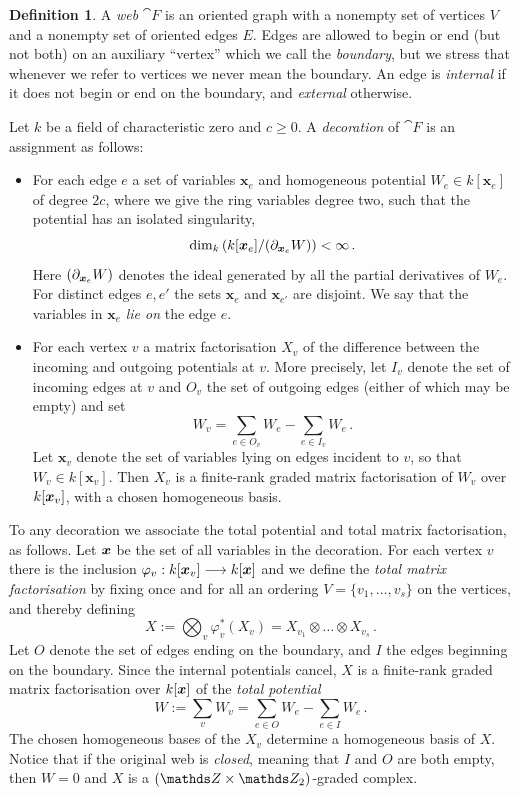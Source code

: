 \documentclass{compositio}
\theoremstyle{definition}
\newtheorem{definition}[theorem]{Definition}
\numberwithin{equation}{section}
\begin{document}
\begin{definition}\label{defwebs}
A \emph{web} $\cat{F}$ is an oriented graph with a nonempty set of vertices $V$ and a nonempty set of oriented edges $E$. Edges are allowed to begin or end (but not both) on an auxiliary ``vertex'' which we call the \emph{boundary}, but we stress that whenever we refer to vertices we never mean the boundary. An edge is \emph{internal} if it does not begin or end on the boundary, and \emph{external} otherwise. 

Let $k$ be a field of characteristic zero and $c \ge 0$. A \emph{decoration} of $\cat{F}$ is an assignment as follows:
\begin{itemize}
\item For each edge $e$ a set of variables $\boldsymbol{x}_e$ and homogeneous potential $W_e \in k[\boldsymbol{x}_e]$ of degree $2c$, where we give the ring variables degree two, such that the potential has an isolated singularity, 
\[
\dim_k\left( k[\boldsymbol{x}_e]/(\partial_{\boldsymbol{x}_e} W) \right) < \infty \, .
\]
Here $(\partial_{\boldsymbol{x}_e} W)$ denotes the ideal generated by all the partial derivatives of $W_e$. For distinct edges $e,e'$ the sets $\boldsymbol{x}_e$ and $\boldsymbol{x}_{e'}$ are disjoint. We say that the variables in $\boldsymbol{x}_e$ \emph{lie on} the edge $e$.
\item For each vertex $v$ a matrix factorisation $X_v$ of the difference between the incoming and outgoing potentials at $v$. More precisely, let $I_v$ denote the set of incoming edges at $v$ and $O_v$ the set of outgoing edges (either of which may be empty) and set
\[
W_v = \sum_{e \in O_v} W_e - \sum_{e \in I_v} W_e \, .
\]
Let $\boldsymbol{x}_v$ denote the set of variables lying on edges incident to $v$, so that $W_v \in k[\boldsymbol{x}_v]$. Then $X_v$ is a finite-rank graded matrix factorisation of $W_v$ over $k[\boldsymbol{x}_v]$, with a chosen homogeneous basis.
\end{itemize}
To any decoration we associate the total potential and total matrix factorisation, as follows. Let $\boldsymbol{x}$ be the set of all variables in the decoration. For each vertex $v$ there is the inclusion $\varphi_v: k[\boldsymbol{x}_v] \longrightarrow k[\boldsymbol{x}]$ and we define the \emph{total matrix factorisation} by fixing once and for all an ordering $V = \{ v_1, \ldots, v_s \}$ on the vertices, and thereby defining
\[
X := \bigotimes_v \varphi_v^*(X_v) = X_{v_1} \otimes \ldots \otimes X_{v_s}\,.
\]
Let $O$ denote the set of edges ending on the boundary, and $I$ the edges beginning on the boundary. Since the internal potentials cancel, $X$ is a finite-rank graded matrix factorisation over $k[\boldsymbol{x}]$ of the \emph{total potential}
\[
W := \sum_v W_v = \sum_{e \in O} W_e - \sum_{e \in I} W_e\,.
\]
The chosen homogeneous bases of the $X_v$ determine a homogeneous basis of $X$. Notice that if the original web is \emph{closed}, meaning that $I$ and $O$ are both empty, then $W = 0$ and $X$ is a $(\ZZ \times \Ztwo)$-graded complex.
\end{definition}
\end{document}
